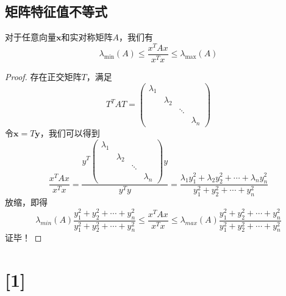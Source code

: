 \documentclass[lang=cn,10pt]{elegantbook}
\newcommand\bv[1]{\boldsymbol{#1}}
\begin{document}
\section{矩阵特征值不等式}
\begin{theorem}
	对于任意向量$\bv{x}$和实对称矩阵$A$，我们有
	\begin{equation}
		\lambda_{\mathrm{min}}\left(A\right)\leq\frac{x^{T}Ax}{x^{T}x}\leq\lambda_{\mathrm{max}}\left(A\right)
	\end{equation}
\end{theorem}
\begin{proof}
	存在正交矩阵$T$，满足
	\begin{equation*}
		T^TAT = \begin{pmatrix}
			\lambda_1 &           &        &           \\
			          & \lambda_2 &        &           \\
			          &           & \ddots &           \\
			          &           &        & \lambda_n
		\end{pmatrix}
	\end{equation*}
	令$\bv{x} = T\bv{y}$，我们可以得到
	\begin{equation*}
		\frac{x^{T}Ax}{x^{T}x}=\frac{y^{T}\left(
			\begin{matrix}\lambda_{1} &             &        & \\
                          & \lambda_{2} &        & \\
                          &             & \ddots & \\&&&\lambda_{n}
				\end{matrix}\right)y}{y^{T}y}
		=\frac{\lambda_{1}y_{1}^{2}+\lambda_{2}y_{2}^{2}+\cdots+\lambda_{n}y_{n}^{2}}{y_{1}^{2}+{y}_{2}^{2}+\cdots+{y}_{n}^{2}}
	\end{equation*}
	放缩，即得
	\begin{equation*}
		\lambda_{min}(A)\frac{y_{1}^{2}+y_{2}^{2}+\cdots+y_{n}^{2}}{y_{1}^{2}+y_{2}^{2}+\cdots+y_{n}^{2}}
		\leq \frac{x^{T}Ax}{x^{T}x}
		\leq \lambda_{max}(A)\frac{y_{1}^{2}+y_{2}^{2}+\cdots+y_{n}^{2}}{y_{1}^{2}+y_{2}^{2}+\cdots+y_{n}^{2}}
	\end{equation*}
	证毕！
\end{proof}







\appendix

\chapter{[1]}
\end{document}
